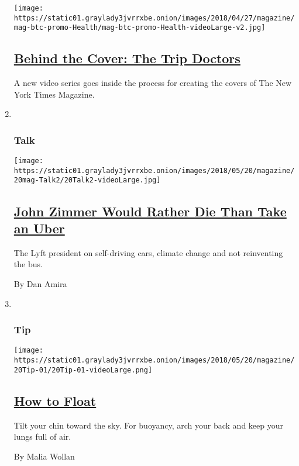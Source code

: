 \begin{enumerate}
  \texttt{[image: https://static01.graylady3jvrrxbe.onion/images/2018/04/27/magazine/mag-btc-promo-Health/mag-btc-promo-Health-videoLarge-v2.jpg]}

  \hypertarget{behind-the-cover-the-trip-doctors}{%
  \subsection{\texorpdfstring{\href{/2018/05/16/magazine/behind-the-cover-the-trip-doctors.html}{Behind
  the Cover: The Trip
  Doctors}}{Behind the Cover: The Trip Doctors}}\label{behind-the-cover-the-trip-doctors}}

  A new video series goes inside the process for creating the covers of
  The New York Times Magazine.
\item ~
  \hypertarget{talk}{%
  \subsubsection{Talk}\label{talk}}

  \texttt{[image: https://static01.graylady3jvrrxbe.onion/images/2018/05/20/magazine/20mag-Talk2/20Talk2-videoLarge.jpg]}

  \hypertarget{john-zimmer-would-rather-die-than-take-an-uber}{%
  \subsection{\texorpdfstring{\href{/2018/05/15/magazine/john-zimmer-would-rather-die-than-take-an-uber.html}{John
  Zimmer Would Rather Die Than Take an
  Uber}}{John Zimmer Would Rather Die Than Take an Uber}}\label{john-zimmer-would-rather-die-than-take-an-uber}}

  The Lyft president on self-driving cars, climate change and not
  reinventing the bus.

  By Dan Amira
\item ~
  \hypertarget{tip}{%
  \subsubsection{Tip}\label{tip}}

  \texttt{[image: https://static01.graylady3jvrrxbe.onion/images/2018/05/20/magazine/20Tip-01/20Tip-01-videoLarge.png]}

  \hypertarget{how-to-float}{%
  \subsection{\texorpdfstring{\href{/2018/05/16/magazine/how-to-float.html}{How
  to Float}}{How to Float}}\label{how-to-float}}

  Tilt your chin toward the sky. For buoyancy, arch your back and keep
  your lungs full of air.

  By Malia Wollan
\end{enumerate}

